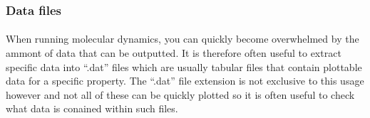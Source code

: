     \subsubsection{Data files}
    \paragraph{}
        When running molecular dynamics, you can quickly become overwhelmed by the ammont of data that can be outputted. It is therefore often useful to extract specific data into \enquote{.dat} files which are usually tabular files that contain plottable data for a specific property. The \enquote{.dat} file extension is not exclusive to this usage however and not all of these can be quickly plotted so it is often useful to check what data is conained within such files. 